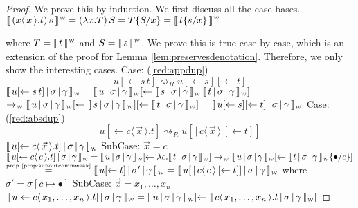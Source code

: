 \documentclass[a4paper,UKenglish,cleveref, autoref]{lipics-v2019}
\newcommand{\abs}[2]{\lambda #1 . #2}
\newcommand{\app}[2]{#1 \, #2}
\newcommand{\fake}[3]{#1 \langle \, #2 \, \rangle . #3}
\newcommand{\share}[3]{#1 [#2 \leftarrow #3]}
\newcommand{\dist}[5]{#1 [ #2 \, \vert \, \fakedist{#4}{#5} \, #3 ]}
\newcommand{\fakedist}[2]{#1 \langle \, #2 \, \rangle}
\newcommand{\sub}[3]{#1 \{ #2 / #3 \}}
\newcommand{\weaksymbol}{\mbox{\tiny $\mathcal{W}$}}
\newcommand{\readweakwmap}[3]{\llbracket \, #1 \, \vert \, #2 \, \vert \, #3  \, \rrbracket_{\weaksymbol} }
\newcommand{\composeweak}[1]{\llbracket \, #1 \, \rrbracket^{\weaksymbol}}
\newcommand{\byprop}[1]{\stackrel{\hbox{\tiny #1}}{\hbox{=}}}
\begin{document}
\begin{proof} We prove this by induction. We first discuss all the case bases.
$\composeweak{\app{(\fake{x}{x}{t})}{s}} = \app{(\abs{x}{T})}{S} = \sub{T}{S}{x} = \composeweak{\sub{t}{s}{x}}$

\noindent where $T = \composeweak{t}$ and $S = \composeweak{s}$.
\newline
\newline
We prove this is true case-by-case, which is an extension of the proof for Lemma \ref{lem:preservesdenotation}. Therefore, we only show the interesting cases.
\newline
\newline
Case: (\ref{red:appdup})
$$\share{u}{}{\app{s}{t}} \rightsquigarrow_{R} \share{\share{u}{}{s}}{}{t} $$
$\readweakwmap{\share{u}{}{\app{s}{t}}}{\sigma}{\gamma} = \share{\readweakwmap{u}{\sigma}{\gamma}}{}{\app{\readweakwmap{s}{\sigma}{\gamma}}{\readweakwmap{t}{\sigma}{\gamma}}} $
\newline
$\rightarrow_{\weaksymbol} \readweakwmap{u}{\sigma}{\gamma} \share{}{}{\readweakwmap{s}{\sigma}{\gamma}} \share{}{}{\readweakwmap{t}{\sigma}{\gamma}} = \readweakwmap{\share{\share{u}{}{s}}{}{t}}{\sigma}{\gamma}$
\newline
\newline
Case: (\ref{red:absdup})
$$\share{u}{}{\fake{c}{\vec{x}}{t}} \rightsquigarrow_{R} \dist{u}{}{\share{}{}{t}}{c}{\vec{x}}$$
$\readweakwmap{\share{u}{}{\fake{c}{\vec{x}}{t}}}{\sigma}{\gamma}$
\newline
\indent SubCase: $\vec{x} = c$
\newline
\indent $\readweakwmap{\share{u}{}{\fake{c}{c}{t}}}{\sigma}{\gamma} = \readweakwmap{u}{\sigma}{\gamma} \share{}{}{\abs{c}{\readweakwmap{t}{\sigma}{\gamma}}} \rightarrow_{\weaksymbol} \readweakwmap{u}{\sigma}{\gamma}\share{}{}{\readweakwmap{t}{\sigma}{\gamma} \sub{}{\bullet}{c}} $
\newline
\indent $\byprop{prop \ref{prop:suboutcommweak}} \readweakwmap{u \share{}{}{t}}{\sigma'}{\gamma} = \readweakwmap{ \dist{u}{}{\share{}{}{t}}{c}{c}}{\sigma}{\gamma}$
\newline
\indent where $\sigma' = \sigma [c \mapsto \bullet]$
\newline
\newline
\indent SubCase: $\vec{x} = x_{1}, \dots, x_{n}$
\newline
\indent $\readweakwmap{\share{u}{}{\fake{c}{x_{1}, \dots, x_{n}}{t}}}{\sigma}{\gamma} = \readweakwmap{u}{\sigma}{\gamma} \share{}{}{\readweakwmap{\fake{c}{x_{1}, \dots, x_{n}}{t}}{\sigma}{\gamma}}$

\end{proof}
\end{document}
